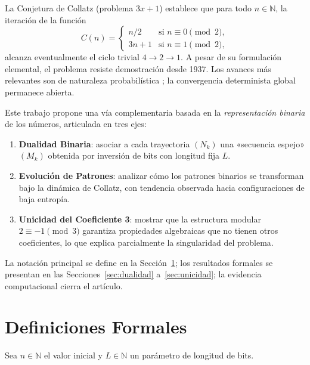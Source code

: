 \documentclass[11pt,a4paper]{article}
\begin{document}
La Conjetura de Collatz (problema $3x+1$) establece que para todo
$n \in \mathbb{N}$, la iteración de la función
\begin{equation}
  C(n) =
  \begin{cases}
    n/2   & \text{si } n \equiv 0 \pmod{2},\\
    3n+1  & \text{si } n \equiv 1 \pmod{2},
  \end{cases}
  \label{eq:collatz}
\end{equation}
alcanza eventualmente el ciclo trivial $4 \to 2 \to 1$.
A pesar de su formulación elemental, el problema resiste demostración
desde 1937. Los avances más relevantes son de naturaleza probabilística
\cite{terras,korec,tao}; la convergencia determinista global permanece abierta.

Este trabajo propone una vía complementaria basada en la
\emph{representación binaria} de los números, articulada en tres ejes:

\begin{enumerate}
  \item \textbf{Dualidad Binaria}: asociar a cada trayectoria $(N_k)$
        una «secuencia espejo» $(M_k)$ obtenida por inversión de bits
        con longitud fija $L$.
  \item \textbf{Evolución de Patrones}: analizar cómo los patrones
        binarios se transforman bajo la dinámica de Collatz, con tendencia
        observada hacia configuraciones de baja entropía.
  \item \textbf{Unicidad del Coeficiente 3}: mostrar que la estructura
        modular $2 \equiv -1 \pmod{3}$ garantiza propiedades algebraicas
        que no tienen otros coeficientes, lo que explica parcialmente
        la singularidad del problema.
\end{enumerate}

\noindent
La notación principal se define en la Sección~\ref{sec:defs};
los resultados formales se presentan en las Secciones~\ref{sec:dualidad}
a~\ref{sec:unicidad}; la evidencia computacional cierra el artículo.

\section{Definiciones Formales}
\label{sec:defs}

Sea $n \in \mathbb{N}$ el valor inicial y $L \in \mathbb{N}$ un parámetro
de longitud de bits.
\end{document}

